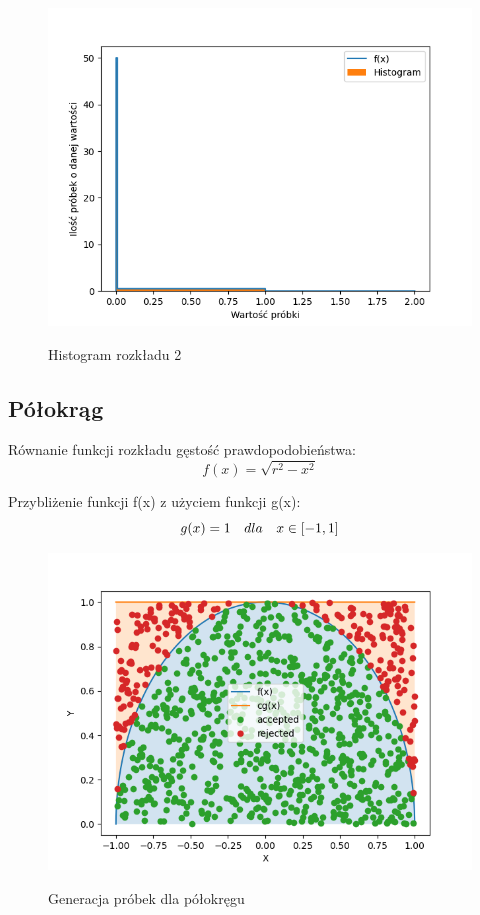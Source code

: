 \documentclass[12pt,a4paper]{article}
\begin{document}
  \begin{figure}[H]
    \centering
    \includegraphics[height=0.4\textheight]{figures/Figure_26.png}
    \label{fig:26}
    \caption{Histogram rozkładu 2}

  \end{figure}


\subsection{Półokrąg}
      
Równanie funkcji rozkładu gęstość prawdopodobieństwa:
\begin{equation}
  f(x) = \sqrt{r^2 - x^2 }
\end{equation}

Przybliżenie funkcji f(x) z użyciem funkcji g(x):
\begin{equation}
  g(x) = 1  \quad dla \quad x  \in [-1, 1] \\
\end{equation}

\begin{figure}[H]
  \centering
  \includegraphics[height=0.4\textheight]{figures/Figure_27.png}
  \label{fig:27}
  \caption{Generacja próbek dla półokręgu}
\end{figure}
\end{document}

